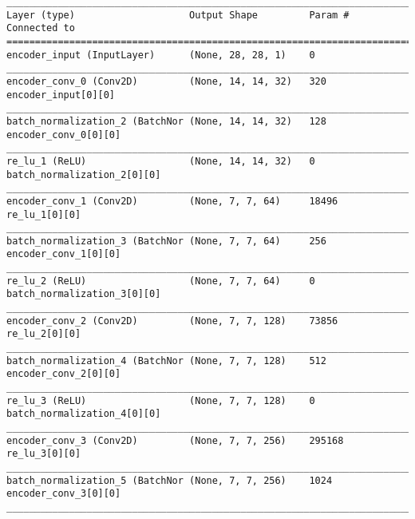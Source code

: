 \begin{lstlisting}[caption={\textsc{Mnist}-\ac{VAE}-\ac{GAN} Encoder},captionpos=b,basicstyle=\tiny, label={lst:mnist-vae-encoder}]
__________________________________________________________________________________________________
Layer (type)                    Output Shape         Param #     Connected to
==================================================================================================
encoder_input (InputLayer)      (None, 28, 28, 1)    0
__________________________________________________________________________________________________
encoder_conv_0 (Conv2D)         (None, 14, 14, 32)   320         encoder_input[0][0]
__________________________________________________________________________________________________
batch_normalization_2 (BatchNor (None, 14, 14, 32)   128         encoder_conv_0[0][0]
__________________________________________________________________________________________________
re_lu_1 (ReLU)                  (None, 14, 14, 32)   0           batch_normalization_2[0][0]
__________________________________________________________________________________________________
encoder_conv_1 (Conv2D)         (None, 7, 7, 64)     18496       re_lu_1[0][0]
__________________________________________________________________________________________________
batch_normalization_3 (BatchNor (None, 7, 7, 64)     256         encoder_conv_1[0][0]
__________________________________________________________________________________________________
re_lu_2 (ReLU)                  (None, 7, 7, 64)     0           batch_normalization_3[0][0]
__________________________________________________________________________________________________
encoder_conv_2 (Conv2D)         (None, 7, 7, 128)    73856       re_lu_2[0][0]
__________________________________________________________________________________________________
batch_normalization_4 (BatchNor (None, 7, 7, 128)    512         encoder_conv_2[0][0]
__________________________________________________________________________________________________
re_lu_3 (ReLU)                  (None, 7, 7, 128)    0           batch_normalization_4[0][0]
__________________________________________________________________________________________________
encoder_conv_3 (Conv2D)         (None, 7, 7, 256)    295168      re_lu_3[0][0]
__________________________________________________________________________________________________
batch_normalization_5 (BatchNor (None, 7, 7, 256)    1024        encoder_conv_3[0][0]
__________________________________________________________________________________________________

\end{lstlisting}
